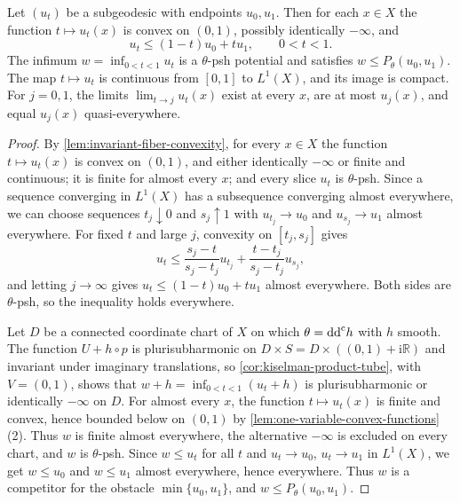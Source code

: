 \begin{proposition}\label{prop:subgeodesic-convexity-and-continuity}
Let $(u_t)$ be a subgeodesic with endpoints $u_0,u_1$. Then for each $x\in X$ the function $t\mapsto u_t(x)$ is convex on $(0,1)$, possibly identically $-\infty$, and
\[
 u_t\leq(1-t)u_0+tu_1,\qquad 0<t<1.
\]
The infimum $w=\inf_{0<t<1}u_t$ is a $\theta$-psh potential and satisfies $w\leq P_\theta(u_0,u_1)$. The map $t\mapsto u_t$ is continuous from $[0,1]$ to $L^1(X)$, and its image is compact. For $j=0,1$, the limits $\lim_{t\to j}u_t(x)$ exist at every $x$, are at most $u_j(x)$, and equal $u_j(x)$ quasi-everywhere.
\end{proposition}
\begin{proof}
By \cref{lem:invariant-fiber-convexity}, for every $x\in X$ the function $t\mapsto u_t(x)$ is convex on $(0,1)$, and either identically $-\infty$ or finite and continuous; it is finite for almost every $x$; and every slice $u_t$ is $\theta$-psh. Since a sequence converging in $L^1(X)$ has a subsequence converging almost everywhere, we can choose sequences $t_j\downarrow0$ and $s_j\uparrow1$ with $u_{t_j}\to u_0$ and $u_{s_j}\to u_1$ almost everywhere. For fixed $t$ and large $j$, convexity on $[t_j,s_j]$ gives
\[
 u_t\leq\frac{s_j-t}{s_j-t_j}u_{t_j}+\frac{t-t_j}{s_j-t_j}u_{s_j},
\]
and letting $j\to\infty$ gives $u_t\leq(1-t)u_0+tu_1$ almost everywhere. Both sides are $\theta$-psh, so the inequality holds everywhere.

Let $D$ be a connected coordinate chart of $X$ on which $\theta=\mathrm{dd}^{\mathrm{c}} h$ with $h$ smooth. The function $U+h\circ p$ is plurisubharmonic on $D\times S=D\times((0,1)+\mathrm i\mathbb R)$ and invariant under imaginary translations, so \cref{cor:kiselman-product-tube}, with $V=(0,1)$, shows that $w+h=\inf_{0<t<1}(u_t+h)$ is plurisubharmonic or identically $-\infty$ on $D$. For almost every $x$, the function $t\mapsto u_t(x)$ is finite and convex, hence bounded below on $(0,1)$ by \cref{lem:one-variable-convex-functions}(2). Thus $w$ is finite almost everywhere, the alternative $-\infty$ is excluded on every chart, and $w$ is $\theta$-psh. Since $w\leq u_t$ for all $t$ and $u_t\to u_0$, $u_t\to u_1$ in $L^1(X)$, we get $w\leq u_0$ and $w\leq u_1$ almost everywhere, hence everywhere. Thus $w$ is a competitor for the obstacle $\min\{u_0,u_1\}$, and $w\leq P_\theta(u_0,u_1)$.


\end{proof}
